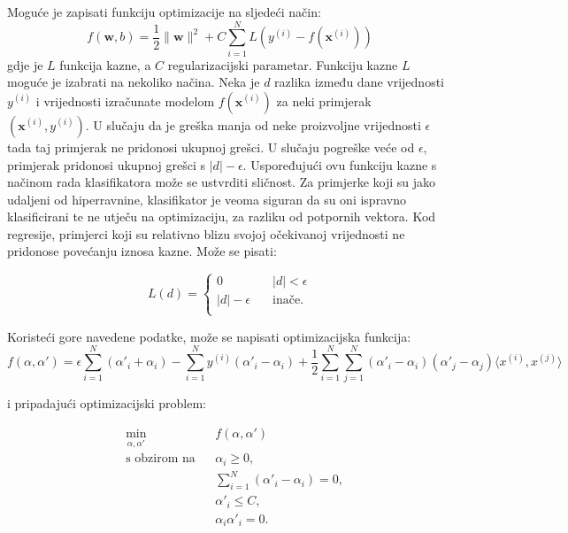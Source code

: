 \documentclass[times, utf8, zavrsni, numeric]{fer}
\begin{document}
Moguće je zapisati funkciju optimizacije na sljedeći način:
\begin{equation}
  f(\mathbf{w}, b) = \frac{1}{2}\|\mathbf{w}\|^2 + 
  C\sum_{i=1}^{N}L(y^{(i)} - f(\mathbf{x}^{(i)}))
\end{equation}
gdje je $L$ funkcija kazne, a $C$ regularizacijski parametar. 
Funkciju kazne $L$ moguće je izabrati na nekoliko načina. 
Neka je $d$ razlika između dane vrijednosti $y^{(i)}$ i vrijednosti izračunate modelom $f(\mathbf{x}^{(i)})$
za neki primjerak $(\mathbf{x}^{(i)}, y^{(i)})$. 
U slučaju da je greška manja od neke proizvoljne vrijednosti $\epsilon$ tada taj primjerak ne pridonosi
ukupnoj grešci. 
U slučaju pogreške veće od $\epsilon$, primjerak pridonosi ukupnoj grešci s $|d| - \epsilon$.
Uspoređujući ovu funkciju kazne s načinom rada klasifikatora može se ustvrditi sličnost.
Za primjerke koji su jako udaljeni od hiperravnine, klasifikator je veoma siguran da su oni ispravno 
klasificirani te ne utječu na optimizaciju, za razliku od potpornih vektora. 
Kod regresije, primjerci koji su relativno blizu svojoj očekivanoj vrijednosti ne pridonose povećanju
iznosa kazne. Može se pisati:

\begin{equation}
  L(d) = 
  \begin{cases}
    0 & \quad |d| < \epsilon\\
    |d| - \epsilon & \quad \text{inače}.\\
  \end{cases}
\end{equation}

Koristeći gore navedene podatke, može se napisati optimizacijska funkcija:
\begin{equation*}
  f(\alpha, \alpha') = \epsilon \sum_{i=1}^{N} (\alpha'_i + \alpha_i) - 
  \sum_{i=1}^{N} y^{(i)}(\alpha'_i - \alpha_i) + \frac{1}{2}\sum_{i=1}^{N}\sum_{j=1}^{N}
(\alpha'_i - \alpha_i)(\alpha'_j - \alpha_j)\langle x^{(i)},x^{(j)} \rangle
\end{equation*}

i pripadajući optimizacijski problem:

\begin{equation}
\begin{aligned}
& \underset{\alpha, \alpha'}{\text{min}}
& & f(\alpha, \alpha')\\
& \text{s obzirom na}
& & \alpha_i \geq 0, \\
&&& \sum_{i=1}^{N} (\alpha'_i - \alpha_i) = 0,\\
&&& \alpha'_i \leq C,\\
&&& \alpha_i\alpha'_i = 0.
\end{aligned}
\end{equation}
\end{document}
